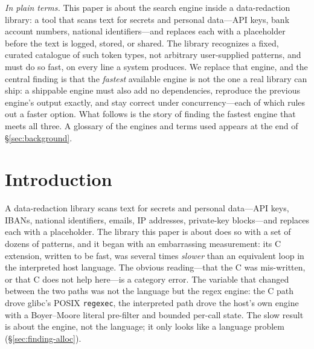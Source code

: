 \documentclass[acmsmall,nonacm,screen]{acmart}
\begin{document}

\maketitle

\noindent\emph{In plain terms.} This paper is about the search engine inside a
data-redaction library: a tool that scans text for secrets and personal data---API
keys, bank account numbers, national identifiers---and replaces each with a
placeholder before the text is logged, stored, or shared. The library recognizes a
fixed, curated catalogue of such token types, not arbitrary user-supplied patterns,
and must do so fast, on every line a system produces. We replace that engine, and the
central finding is that the \emph{fastest} available engine is not the one a real
library can ship: a shippable engine must also add no dependencies, reproduce the
previous engine's output exactly, and stay correct under concurrency---each of which
rules out a faster option. What follows is the story of finding the fastest engine
that meets all three. A glossary of the engines and terms used appears at the end of
\S\ref{sec:background}.

\section{Introduction}
\label{sec:intro}
A data-redaction library scans text for secrets and personal data---API keys,
IBANs, national identifiers, emails, IP addresses, private-key blocks---and
replaces each with a placeholder. The library this paper is about does so with a set
of dozens of patterns, and it began with an embarrassing measurement: its C
extension, written to be fast, was several times \emph{slower} than an equivalent
loop in the interpreted host language. The obvious reading---that the C was
mis-written, or that C does not help here---is a category error. The variable that
changed between the two paths was not the language but the regex engine: the C path
drove glibc's POSIX \texttt{regexec}, the interpreted path drove the host's own
engine with a Boyer--Moore literal pre-filter and bounded per-call state. The slow
result is about the engine, not the language; it only looks like a language
problem (\S\ref{sec:finding-alloc}).
\end{document}
